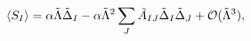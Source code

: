 \begin{equation}
\langle S_{I}\rangle =\alpha \tilde{\Lambda}\tilde{\Delta}_{I}-\alpha \tilde{%
\Lambda}^{2}\sum_{J}\tilde{A}_{IJ}\tilde{\Delta}_{I}\tilde{\Delta}_{J}+{\cal %
O}(\tilde{\Lambda}^{3}),
\end{equation}

